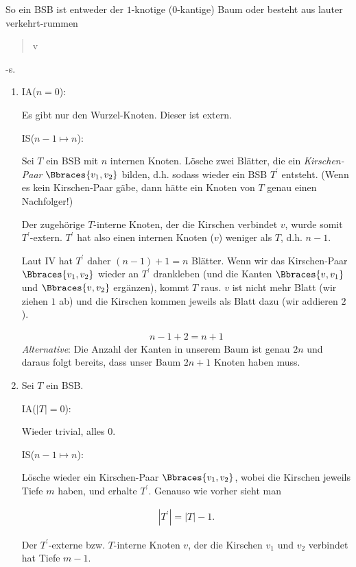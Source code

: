 \begin{solution}

So ein BSB ist entweder der $1$-knotige ($0$-kantige) Baum oder besteht aus lauter verkehrt-rummen \blockquote{v}-s.

\begin{enumerate}[label = \alph*)]

    \item IA($n = 0$):

    Es gibt nur den Wurzel-Knoten.
    Dieser ist extern.

    IS($n-1 \mapsto n$):

    Sei $T$ ein BSB mit $n$ internen Knoten.
    Lösche zwei Blätter, die ein \textit{Kirschen-Paar} $\Bbraces{v_1, v_2}$ bilden, d.h. sodass wieder ein BSB $T^\prime$ entsteht.
    (Wenn es kein Kirschen-Paar gäbe, dann hätte ein Knoten von $T$ genau einen Nachfolger!)

    Der zugehörige $T$-interne Knoten, der die Kirschen verbindet $v$, wurde somit $T^\prime$-extern.
    $T^\prime$ hat also einen internen Knoten ($v$) weniger als $T$, d.h. $n - 1$.

    Laut IV hat $T^\prime$ daher $(n - 1) + 1 = n$ Blätter.
    Wenn wir das Kirschen-Paar $\Bbraces{v_1, v_2}$ wieder an $T^\prime$ drankleben (und die Kanten $\Bbraces{v, v_1}$ und $\Bbraces{v, v_2}$ ergänzen), kommt $T$ raus.
    $v$ ist nicht mehr Blatt (wir ziehen $1$ ab) und die Kirschen kommen jeweils als Blatt dazu (wir addieren $2$).

    \begin{align*}
        n - 1 + 2 = n + 1
    \end{align*}
    \textit{Alternative}:
    Die Anzahl der Kanten in unserem Baum ist genau $2n$ und daraus folgt bereits,
    dass unser Baum $2n + 1$ Knoten haben muss.
    \item Sei $T$ ein BSB.

    IA($|T| = 0$):

    Wieder trivial, alles $0$.

    IS($n-1 \mapsto n$):

    Lösche wieder ein Kirschen-Paar $\Bbraces{v_1, v_2}$, wobei die Kirschen jeweils Tiefe $m$ haben, und erhalte $T^\prime$.
    Genauso wie vorher sieht man

    \begin{align*}
        |T^\prime| = |T| - 1.
    \end{align*}

    Der $T^\prime$-externe bzw. $T$-interne Knoten $v$, der die Kirschen $v_1$ und $v_2$ verbindet hat Tiefe $m - 1$.


\end{enumerate}
\end{solution}
